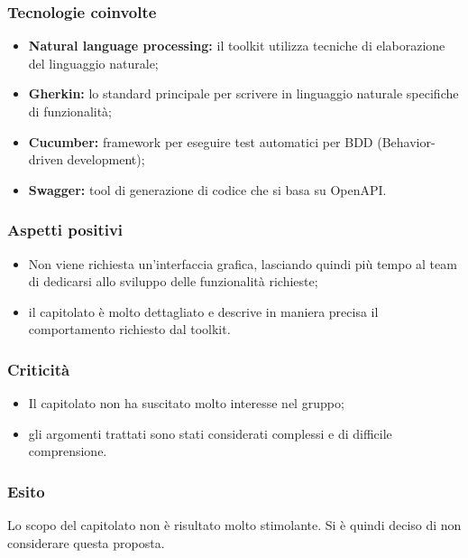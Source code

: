 \subsubsection{Tecnologie coinvolte}
	\begin{itemize}
		\item \textbf{Natural language processing:} il toolkit utilizza tecniche di elaborazione del linguaggio naturale; 
		\item \textbf{Gherkin}\textbf{:} lo standard principale per scrivere in linguaggio naturale specifiche di funzionalità; 
		\item \textbf{Cucumber}\textbf{:} framework per eseguire test automatici per BDD 
		(Behavior-driven development); 
		\item \textbf{Swagger}\textbf{:} tool di generazione di codice che si basa su OpenAPI. 
	\end{itemize}

\subsubsection{Aspetti positivi}
	\begin{itemize}
		\item Non viene richiesta un'interfaccia grafica, lasciando quindi più tempo al team di dedicarsi allo sviluppo delle funzionalità richieste; 
		\item il capitolato è molto dettagliato e descrive in maniera precisa il comportamento richiesto dal toolkit.
	\end{itemize}

\subsubsection{Criticità}
\begin{itemize}
	\item Il capitolato non ha suscitato molto interesse nel gruppo; 
	\item gli argomenti trattati sono stati considerati complessi e di difficile comprensione. 
\end{itemize}

\subsubsection{Esito}
Lo scopo del capitolato non è risultato molto stimolante. Si è quindi deciso di non considerare questa proposta. 
